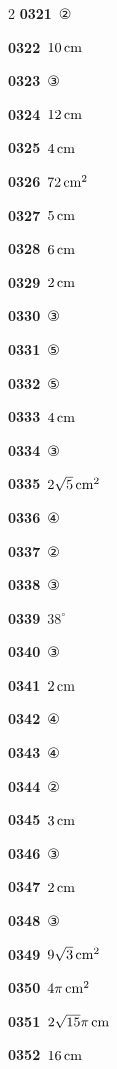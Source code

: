 \documentclass[10pt,a4paper]{article}
\begin{document}
\begin{multicols}{2}
\noindent\textbf{0321}\ ②\par
\noindent\textbf{0322}\ $10\mkern3mu \mathrm{cm}$\par
\noindent\textbf{0323}\ ③\par
\noindent\textbf{0324}\ $12\mkern3mu \mathrm{cm}$\par
\noindent\textbf{0325}\ $4\mkern3mu \mathrm{cm}$\par
\noindent\textbf{0326}\ $72\mkern3mu \mathrm{cm}^2$\par
\noindent\textbf{0327}\ $5\mkern3mu \mathrm{cm}$\par
\noindent\textbf{0328}\ $6\mkern3mu \mathrm{cm}$\par
\noindent\textbf{0329}\ $2\mkern3mu \mathrm{cm}$\par
\noindent\textbf{0330}\ ③\par
\noindent\textbf{0331}\ ⑤\par
\noindent\textbf{0332}\ ⑤\par
\noindent\textbf{0333}\ $4\mkern3mu \mathrm{cm}$\par
\noindent\textbf{0334}\ ③\par
\noindent\textbf{0335}\ $2\sqrt{5}\mkern3mu \mathrm{cm}^2$\par
\noindent\textbf{0336}\ ④\par
\noindent\textbf{0337}\ ②\par
\noindent\textbf{0338}\ ③\par
\noindent\textbf{0339}\ $38^\circ$\par
\noindent\textbf{0340}\ ③\par
\noindent\textbf{0341}\ $2\mkern3mu \mathrm{cm}$\par
\noindent\textbf{0342}\ ④\par
\noindent\textbf{0343}\ ④\par
\noindent\textbf{0344}\ ②\par
\noindent\textbf{0345}\ $3\mkern3mu \mathrm{cm}$\par
\noindent\textbf{0346}\ ③\par
\noindent\textbf{0347}\ $2\mkern3mu \mathrm{cm}$\par
\noindent\textbf{0348}\ ③\par
\noindent\textbf{0349}\ $9\sqrt{3}\mkern3mu \mathrm{cm}^2$\par
\noindent\textbf{0350}\ $4\pi\mkern3mu \mathrm{cm}^2$\par
\noindent\textbf{0351}\ $2\sqrt{15}\pi\mkern3mu \mathrm{cm}$\par
\noindent\textbf{0352}\ $16\mkern3mu \mathrm{cm}$\par

\end{multicols}
\end{document}
